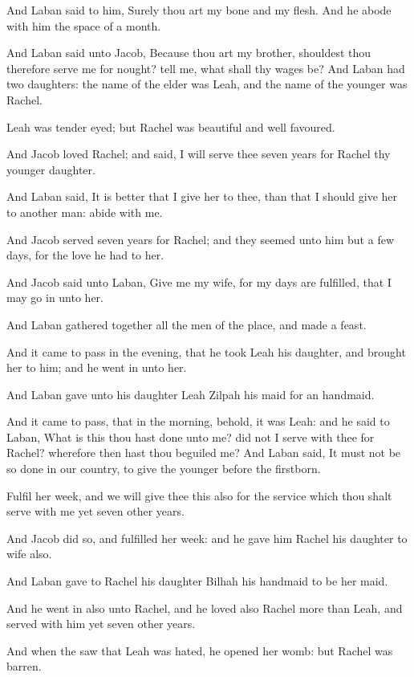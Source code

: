 \Verse And Laban said to him, Surely thou art my bone and my flesh. And he abode with him the space of a month.

\Verse And Laban said unto Jacob, Because thou art my brother, shouldest thou therefore serve me for nought? tell me, what shall thy wages be?  \Verse And Laban had two daughters: the name of the elder was Leah, and the name of the younger was Rachel.

\Verse Leah was tender eyed; but Rachel was beautiful and well favoured.

\Verse And Jacob loved Rachel; and said, I will serve thee seven years for Rachel thy younger daughter.

\Verse And Laban said, It is better that I give her to thee, than that I should give her to another man: abide with me.

\Verse And Jacob served seven years for Rachel; and they seemed unto him but a few days, for the love he had to her.

\Verse And Jacob said unto Laban, Give me my wife, for my days are fulfilled, that I may go in unto her.

\Verse And Laban gathered together all the men of the place, and made a feast.

\Verse And it came to pass in the evening, that he took Leah his daughter, and brought her to him; and he went in unto her.

\Verse And Laban gave unto his daughter Leah Zilpah his maid for an handmaid.

\Verse And it came to pass, that in the morning, behold, it was Leah: and he said to Laban, What is this thou hast done unto me? did not I serve with thee for Rachel? wherefore then hast thou beguiled me?  \Verse And Laban said, It must not be so done in our country, to give the younger before the firstborn.

\Verse Fulfil her week, and we will give thee this also for the service which thou shalt serve with me yet seven other years.

\Verse And Jacob did so, and fulfilled her week: and he gave him Rachel his daughter to wife also.

\Verse And Laban gave to Rachel his daughter Bilhah his handmaid to be her maid.

\Verse And he went in also unto Rachel, and he loved also Rachel more than Leah, and served with him yet seven other years.

\Verse And when the \LORD saw that Leah was hated, he opened her womb: but Rachel was barren.

